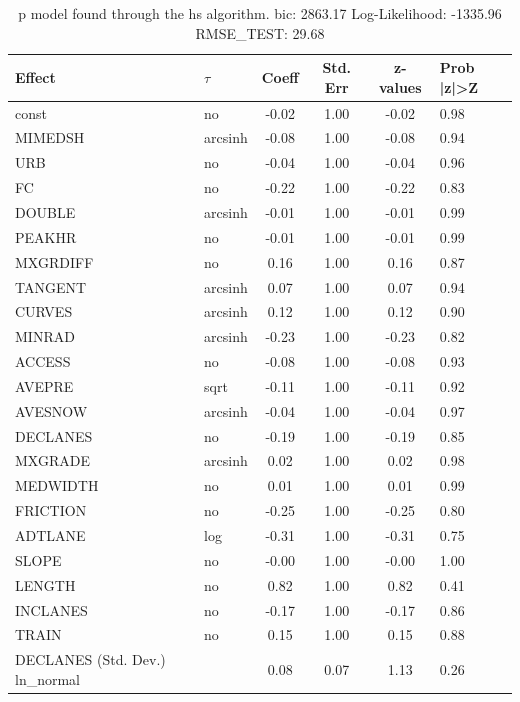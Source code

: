 \begin{table}
	\caption{p model found through the hs algorithm. bic: 2863.17 Log-Likelihood: -1335.96 RMSE_TEST: 29.68}
	\begin{center}
		\begin{tabular}{|l|l|c|c|c|l|}
			\hline
			Effect & $\tau$ & Coeff & Std. Err & z-values & Prob |z|>Z \\
			\hline
			const & no & -0.02 & 1.00 & -0.02 & 0.98 \\
			\hline
			MIMEDSH & arcsinh & -0.08 & 1.00 & -0.08 & 0.94 \\
			\hline
			URB & no & -0.04 & 1.00 & -0.04 & 0.96 \\
			\hline
			FC & no & -0.22 & 1.00 & -0.22 & 0.83 \\
			\hline
			DOUBLE & arcsinh & -0.01 & 1.00 & -0.01 & 0.99 \\
			\hline
			PEAKHR & no & -0.01 & 1.00 & -0.01 & 0.99 \\
			\hline
			MXGRDIFF & no & 0.16 & 1.00 & 0.16 & 0.87 \\
			\hline
			TANGENT & arcsinh & 0.07 & 1.00 & 0.07 & 0.94 \\
			\hline
			CURVES & arcsinh & 0.12 & 1.00 & 0.12 & 0.90 \\
			\hline
			MINRAD & arcsinh & -0.23 & 1.00 & -0.23 & 0.82 \\
			\hline
			ACCESS & no & -0.08 & 1.00 & -0.08 & 0.93 \\
			\hline
			AVEPRE & sqrt & -0.11 & 1.00 & -0.11 & 0.92 \\
			\hline
			AVESNOW & arcsinh & -0.04 & 1.00 & -0.04 & 0.97 \\
			\hline
			DECLANES & no & -0.19 & 1.00 & -0.19 & 0.85 \\
			\hline
			MXGRADE & arcsinh & 0.02 & 1.00 & 0.02 & 0.98 \\
			\hline
			MEDWIDTH & no & 0.01 & 1.00 & 0.01 & 0.99 \\
			\hline
			FRICTION & no & -0.25 & 1.00 & -0.25 & 0.80 \\
			\hline
			ADTLANE & log & -0.31 & 1.00 & -0.31 & 0.75 \\
			\hline
			SLOPE & no & -0.00 & 1.00 & -0.00 & 1.00 \\
			\hline
			LENGTH & no & 0.82 & 1.00 & 0.82 & 0.41 \\
			\hline
			INCLANES & no & -0.17 & 1.00 & -0.17 & 0.86 \\
			\hline
			TRAIN & no & 0.15 & 1.00 & 0.15 & 0.88 \\
			\hline
			DECLANES (Std. Dev.) ln_normal &  & 0.08 & 0.07 & 1.13 & 0.26 \\

\end{tabular}
\end{center}
\end{table}
